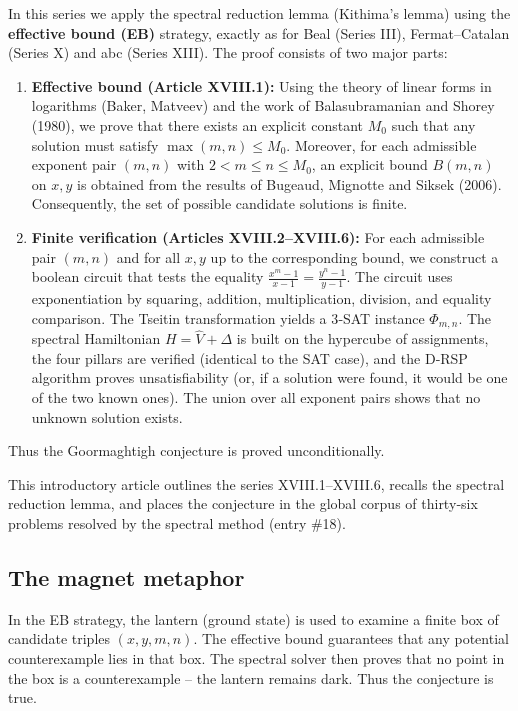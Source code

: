 \documentclass[11pt,a4paper]{article}
\begin{document}
In this series we apply the spectral reduction lemma (Kithima's lemma) using the \textbf{effective bound (EB)} strategy, exactly as for Beal (Series III), Fermat–Catalan (Series X) and abc (Series XIII). The proof consists of two major parts:

\begin{enumerate}
\item \textbf{Effective bound (Article XVIII.1):} Using the theory of linear forms in logarithms (Baker, Matveev) and the work of Balasubramanian and Shorey (1980), we prove that there exists an explicit constant \(M_0\) such that any solution must satisfy \(\max(m,n)\le M_0\). Moreover, for each admissible exponent pair \((m,n)\) with \(2<m\le n\le M_0\), an explicit bound \(B(m,n)\) on \(x,y\) is obtained from the results of Bugeaud, Mignotte and Siksek (2006). Consequently, the set of possible candidate solutions is finite.
\item \textbf{Finite verification (Articles XVIII.2–XVIII.6):} For each admissible pair \((m,n)\) and for all \(x,y\) up to the corresponding bound, we construct a boolean circuit that tests the equality \(\frac{x^{m}-1}{x-1} = \frac{y^{n}-1}{y-1}\). The circuit uses exponentiation by squaring, addition, multiplication, division, and equality comparison. The Tseitin transformation yields a 3‑SAT instance \(\Phi_{m,n}\). The spectral Hamiltonian \(H = \hat{V} + \Delta\) is built on the hypercube of assignments, the four pillars are verified (identical to the SAT case), and the D‑RSP algorithm proves unsatisfiability (or, if a solution were found, it would be one of the two known ones). The union over all exponent pairs shows that no unknown solution exists.
\end{enumerate}

Thus the Goormaghtigh conjecture is proved unconditionally.

This introductory article outlines the series XVIII.1–XVIII.6, recalls the spectral reduction lemma, and places the conjecture in the global corpus of thirty‑six problems resolved by the spectral method (entry \#18).

\subsection{The magnet metaphor}

In the EB strategy, the lantern (ground state) is used to examine a finite box of candidate triples \((x,y,m,n)\). The effective bound guarantees that any potential counterexample lies in that box. The spectral solver then proves that no point in the box is a counterexample – the lantern remains dark. Thus the conjecture is true.
\end{document}

